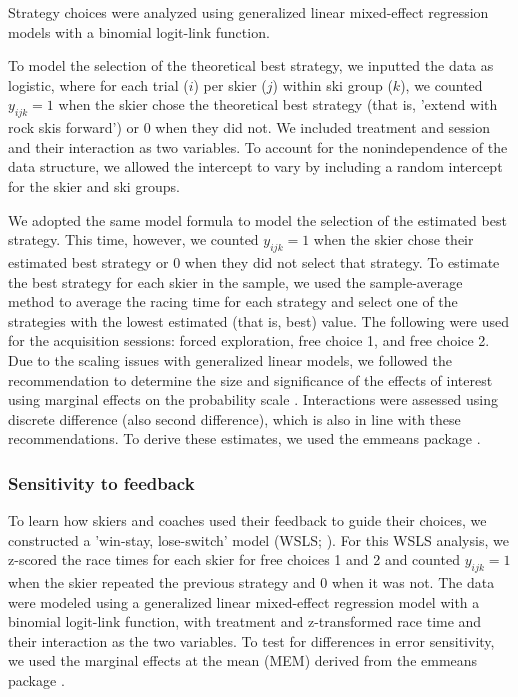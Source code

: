 \documentclass[pdflatex,sn-mathphys-num]{sn-jnl}%
\theoremstyle{thmstyleone}%
\theoremstyle{thmstyletwo}%
\theoremstyle{thmstylethree}%
\begin{document}
Strategy choices were analyzed using generalized linear mixed-effect regression models with a binomial logit-link function.

To model the selection of the theoretical best strategy, we inputted the data as logistic, where for each trial (\(i\)) per skier (\(j\)) within ski group (\(k\)), we counted \(y_{ijk}=1\) when the skier chose the theoretical best strategy (that is, 'extend with rock skis forward') or 0 when they did not. We included treatment and session and their interaction as two variables. To account for the nonindependence of the data structure, we allowed the intercept to vary by including a random intercept for the skier and ski groups.

 We adopted the same model formula to model the selection of the estimated best strategy. This time, however, we counted \(y_{ijk}=1\) when the skier chose their estimated best strategy or 0 when they did not select that strategy. To estimate the best strategy for each skier in the sample, we used the sample-average method \cite{sutton_reinforcement_2018} to average the racing time for each strategy and select one of the strategies with the lowest estimated (that is, best) value. The following were used for the acquisition sessions: forced exploration, free choice 1, and free choice 2. Due to the scaling issues with generalized linear models, we followed the recommendation to determine the size and significance of the effects of interest using marginal effects on the probability scale \cite{mize_best_2019, mccabe_interpreting_2022}. Interactions were assessed using discrete difference (also second difference), which is also in line with these recommendations. To derive these estimates, we used the emmeans package \cite{lenth_emmeans_2023}.

 \subsubsection{Sensitivity to feedback}

To learn how skiers and coaches used their feedback to guide their choices, we constructed a 'win-stay, lose-switch' model (WSLS; \cite{nowak_strategy_1993, worthy_comparison_2014, iyer_probing_2020}). For this WSLS analysis, we z-scored the race times for each skier for free choices 1 and 2 and counted \(y_{ijk}=1\) when the skier repeated the previous strategy and 0 when it was not. The data were modeled using a generalized linear mixed-effect regression model with a binomial logit-link function, with treatment and z-transformed race time and their interaction as the two variables. To test for differences in error sensitivity, we used the marginal effects at the mean (MEM) derived from the emmeans package \cite{lenth_emmeans_2023}.
\end{document}
